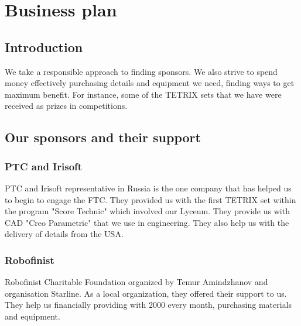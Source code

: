 \section{Business plan}
	\subsection{Introduction}
	We take a responsible approach to finding sponsors. We also strive to spend money effectively purchasing details and equipment we need, finding ways to get maximum benefit. For instance, some of the TETRIX sets that we have were received as prizes in competitions.
	
	\subsection{Our sponsors and their support}
		\subsubsection{PTC and Irisoft}
		PTC and Irisoft representative in Russia is the one company that has helped us to begin to engage the FTC. They provided us with the first TETRIX set within the program "Score Technic" which involved our Lyceum. They provide us with CAD "Creo Parametric" that we use in engineering. They also help us with the delivery of details from the USA.
		
		\subsubsection{Robofinist}	
		Robofinist Charitable Foundation organized by Temur Amindzhanov and organisation Starline. As a local organization, they offered their support to us. They help us financially providing with 2000 \textdollar every month, purchasing materials and equipment.
		
		
